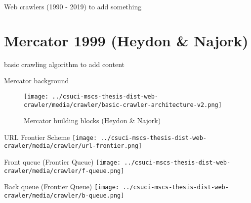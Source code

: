 \documentclass[9pt]{beamer}
\begin{document}

\begin{frame}{Web crawlers (1990 - 2019)}
  to add something
\end{frame}


\section[Mercator]{Mercator 1999 (Heydon \& Najork)}
\begin{frame}[plain]
\end{frame}


\begin{frame}{basic crawling algorithm}
  to add content
\end{frame}


\begin{frame}{Mercator background}
  \centering
  \begin{figure}
  \texttt{[image: ../csuci-mscs-thesis-dist-web-crawler/media/crawler/basic-crawler-architecture-v2.png]}
  \caption{Mercator building blocks (Heydon \& Najork)}
  \end{figure}
\end{frame}


\begin{frame}{URL Frontier Scheme}
  \centering
  \texttt{[image: ../csuci-mscs-thesis-dist-web-crawler/media/crawler/url-frontier.png]}
\end{frame}


\begin{frame}{Front queue (Frontier Queue)}
  \centering
  \texttt{[image: ../csuci-mscs-thesis-dist-web-crawler/media/crawler/f-queue.png]}
\end{frame}


\begin{frame}{Back queue (Frontier Queue)}
  \centering
  \texttt{[image: ../csuci-mscs-thesis-dist-web-crawler/media/crawler/b-queue.png]}
\end{frame}
\end{document}
